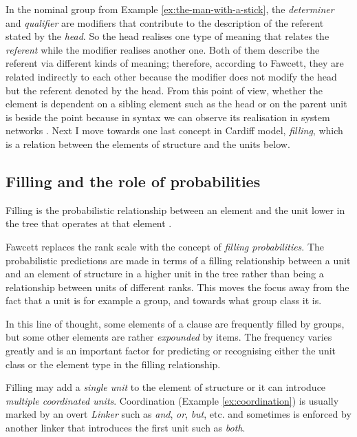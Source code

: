     In the nominal group from Example \ref{ex:the-man-with-a-stick}, the \textit{determiner} and \textit{qualifier} are modifiers that contribute to the description of the referent stated by the \textit{head}. So the head realises one type of meaning that relates the \textit{referent} while the modifier realises another one. Both of them describe the referent via different kinds of meaning; therefore, according to Fawcett, they are related indirectly to each other because the modifier does not modify the head but the referent denoted by the head. From this point of view, whether the element is dependent on a sibling element such as the head or on the parent unit is beside the point because in syntax we can observe its realisation in system networks \citep[216--217]{Fawcett2000}.
    Next I move towards one last concept in Cardiff model, \textit{filling}, which is a relation between the elements of structure and the units below.
    
    \subsection{Filling and the role of probabilities}
    \begin{definition}[Filling]\label{def:filling}
        Filling is the probabilistic relationship between an element and the unit lower in the tree that operates at that element \citep[238, 251]{Fawcett2000}. 
    \end{definition}

    Fawcett replaces the rank scale with the concept of \textit{filling probabilities}. The probabilistic predictions are made in terms of a filling relationship between a unit and an element of structure in a higher unit in the tree rather than being a relationship between units of different ranks. This moves the focus away from the fact that a unit is for example a group, and towards what group class it is. 
    
    In this line of thought, some elements of a clause are frequently filled by groups, but some other elements are rather \textit{expounded} by items. The frequency varies greatly and is an important factor for predicting or recognising either the unit class or the element type in the filling relationship. 
    
    Filling may add a \textit{single unit} to the element of structure or it can introduce \textit{multiple coordinated units}. Coordination (Example \ref{ex:coordination}) is usually marked by an overt \textit{Linker} such as \textit{and}, \textit{or}, \textit{but}, etc. and sometimes is enforced by another linker that introduces the first unit such as \textit{both}.

